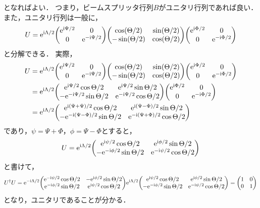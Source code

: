 \documentclass{report}
\begin{document}
    となればよい．
    つまり，ビームスプリッタ行列$B$がユニタリ行列であれば良い．
    また，ユニタリ行列は一般に，
    \begin{align}
      U = \e^{\i\Lambda/2}
      \mqty(
        \e^{\i\Psi/2} & 0 \\ 
        0 & \e^{-\i\Psi/2}
      )
      \mqty(
        \cos(\Theta/2) & \sin(\Theta/2) \\ 
        -\sin(\Theta/2) & \cos(\Theta/2)
      )\mqty(
        \e^{\i\Phi/2} & 0 \\ 
        0 & \e^{-\i\Phi/2}
      )
    \end{align}
    と分解できる．
    実際，
    \begin{align}
      U &= \e^{\i\Lambda/2}
      \mqty(
        \e^{\i\Psi/2} & 0 \\ 
        0 & \e^{-\i\Psi/2}
      )
      \mqty(
        \cos(\Theta/2) & \sin(\Theta/2) \\ 
        -\sin(\Theta/2) & \cos(\Theta/2)
      )\mqty(
        \e^{\i\Phi/2} & 0 \\ 
        0 & \e^{-\i\Phi/2}
      ) \\ 
      &= \e^{\i\Lambda/2}\mqty(
        \e^{\i\Psi/2}\cos\Theta/2 & \e^{\i\Psi/2}\sin\Theta/2 \\ 
        -\e^{-\i\Psi/2}\sin\Theta/2 & \e^{-\i\Psi/2}\cos\Theta/2
      )\mqty(
        \e^{\i\Phi/2} & 0 \\ 
        0 & \e^{-\i\Phi/2}
      ) \\ 
      &= \e^{\i\Lambda/2}\mqty(
        \e^{\i(\Psi + \Psi) / 2}\cos\Theta/2 & \e^{\i(\Psi - \Phi) / 2}\sin\Theta/2 \\ 
        -\e^{-\i(\Psi - \Phi) / 2}\sin\Theta/2 & \e^{-\i(\Psi + \Phi) / 2}\cos\Theta/2
      )
    \end{align}
    であり，$\psi = \Psi + \Phi$，$\phi = \Psi - \Phi$とすると，
    \begin{align}
      U = \e^{\i\Lambda/2}\mqty(
        \e^{\i\psi / 2}\cos\Theta/2 & \e^{\i\phi / 2}\sin\Theta/2 \\ 
        -\e^{-\i\phi / 2}\sin\Theta/2 & \e^{-\i\psi / 2}\cos\Theta/2
      )
    \end{align}
    と書けて，
    \begin{align}
      U^{\dag}U = \e^{-\i\Lambda/2}\mqty(
        \e^{-\i\psi / 2}\cos\Theta/2 & -\e^{\i\phi / 2}\sin\Theta/2 \\ 
        \e^{-\i\phi / 2}\sin\Theta/2 & \e^{\i\psi / 2}\cos\Theta/2
      )
      \e^{\i\Lambda/2}\mqty(
        \e^{\i\psi / 2}\cos\Theta/2 & \e^{\i\phi / 2}\sin\Theta/2 \\ 
        -\e^{-\i\phi / 2}\sin\Theta/2 & \e^{-\i\psi / 2}\cos\Theta/2
      )
      = \mqty(1 & 0 \\ 0 & 1)
    \end{align}
    となり，ユニタリであることが分かる．
\end{document}
